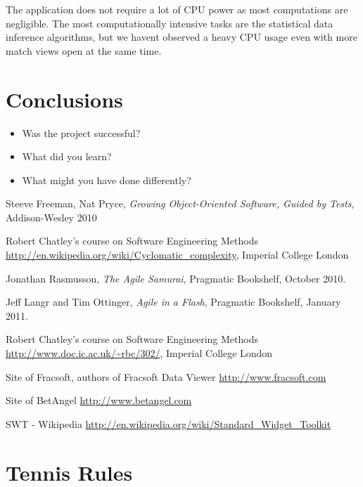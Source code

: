 \documentclass[10pt]{report}
\begin{document}
The application does not require a lot of CPU power as most computations are negligible. The most computationally intensive tasks are the statistical data inference algorithms, but we havent observed a heavy CPU usage even with more match views open at the same time.

\clearpage

\chapter{Conclusions}
  \begin{itemize} 
  \item Was the project successful?
  \item What did you learn?
  \item What might you have done differently?
  \end{itemize}  

\begin{thebibliography}{9}
  Steeve Freeman, Nat Pryce,
  \emph{Growing Object-Oriented Software, Guided by Tests}, Addison-Wesley 2010

  Robert Chatley's course on Software Engineering Methods
  \url{http://en.wikipedia.org/wiki/Cyclomatic_complexity},
  Imperial College London

  Jonathan Rasmusson,
  \emph{The Agile Samurai},
  Pragmatic Bookshelf,
  October 2010.

  Jeff Langr and Tim Ottinger,
  \emph{Agile in a Flash},
  Pragmatic Bookshelf, 
  January 2011.

  Robert Chatley's course on Software Engineering Methods
  \url{http://www.doc.ic.ac.uk/~rbc/302/},
  Imperial College London

  Site of Fracsoft, authors of Fracsoft Data Viewer
  \url{http://www.fracsoft.com}

  Site of BetAngel
  \url{http://www.betangel.com}
  
  SWT - Wikipedia
  \url{http://en.wikipedia.org/wiki/Standard_Widget_Toolkit}

\end{thebibliography}

\clearpage
\appendix

\chapter{Tennis Rules}
\end{document}

